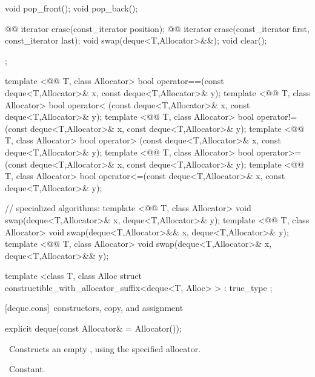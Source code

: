 \documentclass[american,twoside]{book}
\begin{document}
\begin{codeblock}
{{    void pop_front();
    void pop_back();

    @@ iterator erase(const_iterator position);
    @@ iterator erase(const_iterator first, const_iterator last);
    void     swap(deque<T,Allocator>&&);
    void     clear();
  };

  template <@@ T, class Allocator>
    bool operator==(const deque<T,Allocator>& x, const deque<T,Allocator>& y);
  template <@@ T, class Allocator>
    bool operator< (const deque<T,Allocator>& x, const deque<T,Allocator>& y);
  template <@@ T, class Allocator>
    bool operator!=(const deque<T,Allocator>& x, const deque<T,Allocator>& y);
  template <@@ T, class Allocator>
    bool operator> (const deque<T,Allocator>& x, const deque<T,Allocator>& y);
  template <@@ T, class Allocator>
    bool operator>=(const deque<T,Allocator>& x, const deque<T,Allocator>& y);
  template <@@ T, class Allocator>
    bool operator<=(const deque<T,Allocator>& x, const deque<T,Allocator>& y);

  // specialized algorithms:
  template <@@ T, class Allocator>
    void swap(deque<T,Allocator>& x, deque<T,Allocator>& y);
  template <@@ T, class Allocator>
    void swap(deque<T,Allocator>&& x, deque<T,Allocator>& y);
  template <@@ T, class Allocator>
    void swap(deque<T,Allocator>& x, deque<T,Allocator>&& y);

  template <class T, class Alloc
    struct constructible_with_allocator_suffix<deque<T, Alloc> >
      : true_type { };
}
\end{codeblock}

[deque.cons]{\ constructors, copy, and assignment}

\begin{itemdecl}
explicit deque(const Allocator& = Allocator());
\end{itemdecl}

\begin{itemdescr}
\pnum
\effects\ 
Constructs an empty
,
using the specified allocator.

\pnum
\complexity\ 
Constant.
\end{itemdescr}
\end{document}
